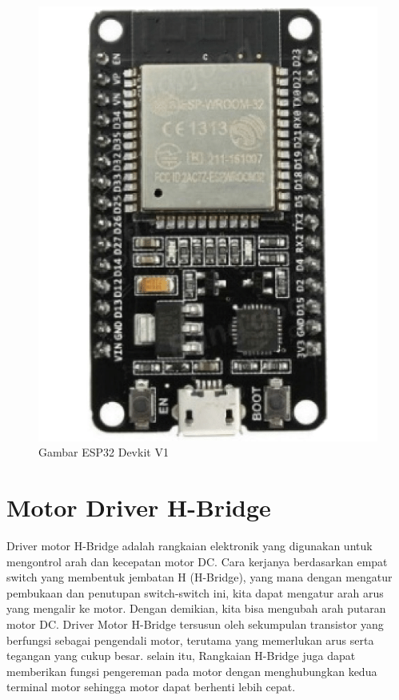 \begin{figure}[H]
  \centering

  \includegraphics[scale=0.2]{gambar/The-ESP32-DEVKIT-V1-board-used-as-controller.png}

  \caption{Gambar ESP32 Devkit V1}
  \label{fig:roketluarangkasa}
\end{figure}

\section{Motor Driver H-Bridge}

Driver motor H-Bridge adalah rangkaian elektronik yang digunakan untuk mengontrol arah dan kecepatan motor DC. Cara kerjanya berdasarkan empat switch yang membentuk jembatan H (H-Bridge), yang mana dengan mengatur pembukaan dan penutupan switch-switch ini, kita dapat mengatur arah arus yang mengalir ke motor. Dengan demikian, kita bisa mengubah arah putaran motor DC. Driver Motor H-Bridge tersusun oleh sekumpulan transistor yang berfungsi sebagai pengendali motor, terutama yang memerlukan arus serta tegangan yang cukup besar. selain itu, Rangkaian H-Bridge juga dapat memberikan fungsi pengereman pada motor dengan menghubungkan kedua terminal motor sehingga motor dapat berhenti lebih cepat. \parencite{fibrianianalisis}

